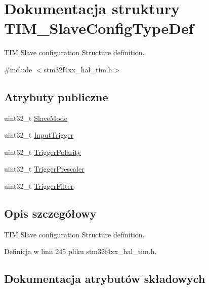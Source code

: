 \hypertarget{struct_t_i_m___slave_config_type_def}{}\section{Dokumentacja struktury T\+I\+M\+\_\+\+Slave\+Config\+Type\+Def}
\label{struct_t_i_m___slave_config_type_def}


T\+IM Slave configuration Structure definition.  




{\ttfamily \#include $<$stm32f4xx\+\_\+hal\+\_\+tim.\+h$>$}

\subsection*{Atrybuty publiczne}
\begin{DoxyCompactItemize}
\item 
uint32\+\_\+t \hyperlink{struct_t_i_m___slave_config_type_def_a2792de155698128ade1e505618c1bc43}{Slave\+Mode}
\item 
uint32\+\_\+t \hyperlink{struct_t_i_m___slave_config_type_def_a82efdad1e2ed9edbd4c895987ebfe0f7}{Input\+Trigger}
\item 
uint32\+\_\+t \hyperlink{struct_t_i_m___slave_config_type_def_afa8fa1801ef5e13115732a495ef11165}{Trigger\+Polarity}
\item 
uint32\+\_\+t \hyperlink{struct_t_i_m___slave_config_type_def_a57be6d41d77a968f1daeac7b65b1ab4c}{Trigger\+Prescaler}
\item 
uint32\+\_\+t \hyperlink{struct_t_i_m___slave_config_type_def_a07d28f704576a41e37bbb7412e0fba60}{Trigger\+Filter}
\end{DoxyCompactItemize}


\subsection{Opis szczegółowy}
T\+IM Slave configuration Structure definition. 

Definicja w linii 245 pliku stm32f4xx\+\_\+hal\+\_\+tim.\+h.



\subsection{Dokumentacja atrybutów składowych}
\mbox{\label{struct_t_i_m___slave_config_type_def_a82efdad1e2ed9edbd4c895987ebfe0f7}} 
